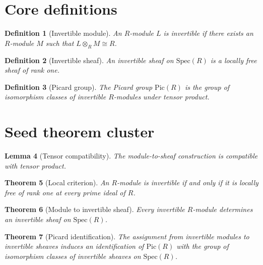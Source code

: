 \documentclass[11pt]{article}
\newtheorem{definition}{Definition}[section]
\newtheorem{lemma}[definition]{Lemma}
\newtheorem{theorem}[definition]{Theorem}
\begin{document}
\section{Core definitions}

\begin{definition}[Invertible module]\label{def:invertible-module}
An $R$-module $L$ is invertible if there exists an $R$-module $M$ such that
$L \otimes_R M \cong R$.
\end{definition}

\begin{definition}[Invertible sheaf]\label{def:invertible-sheaf}
An invertible sheaf on $\mathrm{Spec}(R)$ is a locally free sheaf of rank one.
\end{definition}

\begin{definition}[Picard group]\label{def:picard-group}
The Picard group $\mathrm{Pic}(R)$ is the group of isomorphism classes of
invertible $R$-modules under tensor product.
\end{definition}

\section{Seed theorem cluster}

\begin{lemma}[Tensor compatibility]\label{lem:tensor-compatibility}
The module-to-sheaf construction is compatible with tensor product.
\end{lemma}

\begin{theorem}[Local criterion]\label{thm:local-criterion}
An $R$-module is invertible if and only if it is locally free of rank one at
every prime ideal of $R$.
\end{theorem}

\begin{theorem}[Module to invertible sheaf]\label{thm:module-to-invertible-sheaf}
Every invertible $R$-module determines an invertible sheaf on
$\mathrm{Spec}(R)$.
\end{theorem}

\begin{theorem}[Picard identification]\label{thm:picard-identification}
The assignment from invertible modules to invertible sheaves induces an
identification of $\mathrm{Pic}(R)$ with the group of isomorphism classes of
invertible sheaves on $\mathrm{Spec}(R)$.
\end{theorem}
\end{document}
